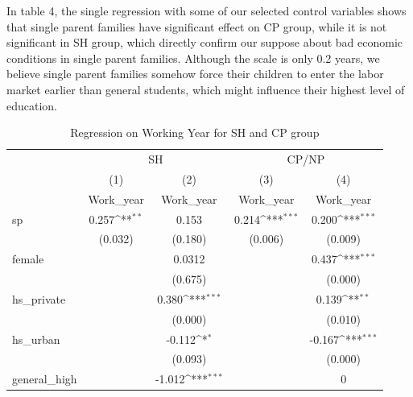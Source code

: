 \documentclass[]{AEA}
\def\sym#1{\ifmmode^{#1}\else\(^{#1}\)\fi}
\begin{document}
    In table 4, the single regression with some of our selected control variables shows that single parent families have significant effect on CP group, while it is not significant in SH group, which directly confirm our suppose about bad economic conditions in single parent families. Although the scale is only 0.2 years, we believe single parent families somehow force their children to enter the labor market earlier than general students, which might influence their highest level of education.
    \begin{center}
        \begin{table}
        \caption{Regression on Working Year for SH and CP group}
        \setlength{\tabcolsep}{0.5mm}
        \begin{tabular}{l*{4}c}
        \toprule
        &\multicolumn{2}{c}{SH} &\multicolumn{2}{c}{CP/NP} \\
        \cmidrule(l){2-3}\cmidrule(l){4-5}
        &\multicolumn{1}{c}{(1)}&\multicolumn{1}{c}{(2)}&\multicolumn{1}{c}{(3)}&\multicolumn{1}{c}{(4)}\\
        &\multicolumn{1}{c}{Work\_year}&\multicolumn{1}{c}{Work\_year}&\multicolumn{1}{c}{Work\_year}&\multicolumn{1}{c}{Work\_year}\\
        \midrule
        sp          &       0.257\sym{**} &       0.153         &       0.214\sym{***}&       0.200\sym{***}\\
                    &     (0.032)         &     (0.180)         &     (0.006)         &     (0.009)         \\
        [1em]
        female      &                     &      0.0312         &                     &       0.437\sym{***}\\
                    &                     &     (0.675)         &                     &     (0.000)         \\
        [1em]
        hs\_private  &                     &       0.380\sym{***}&                     &       0.139\sym{**} \\
                    &                     &     (0.000)         &                     &     (0.010)         \\
        [1em]
        hs\_urban    &                     &      -0.112\sym{*}  &                     &      -0.167\sym{***}\\
                    &                     &     (0.093)         &                     &     (0.000)         \\
        [1em]
        general\_high&                     &      -1.012\sym{***}&                     &           0         \\

\end{tabular}
\end{table}
\end{center}
\end{document}
